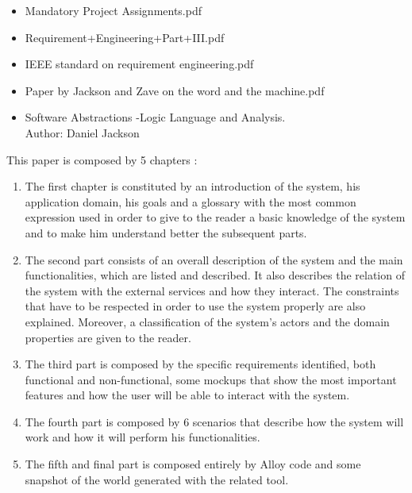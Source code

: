 \begin{itemize}
	\setlength{\leftskip}{0.5cm}
	\item Mandatory Project Assignments.pdf
	\item Requirement+Engineering+Part+III.pdf
	\item IEEE standard on requirement engineering.pdf
	\item Paper by Jackson and Zave on the word and the machine.pdf
	\item Software Abstractions -Logic Language and Analysis.\\
	Author: Daniel Jackson
\end{itemize}

This paper is composed by 5 chapters :
\begin{enumerate}
	\setlength{\leftskip}{0.5cm}
	\item The first chapter is constituted by an introduction of the system, his application domain, his goals and a glossary with the most common expression used in order to give to the reader a basic knowledge of the system and to make him understand better the subsequent parts.
	\item The second part consists of an overall description of the system and the main functionalities, which are listed and described. It also describes the relation of the system with the external services and how they interact. The constraints that have to be respected in order to use the system properly are also explained.
	Moreover, a classification of the system’s actors and the domain properties are given to the reader.
	\item The third part is composed by the specific requirements identified, both functional and non-functional, some mockups that show the most important features and how the user will be able to interact with the system.
	\item The fourth part is composed by 6 scenarios that describe how the system will work and how it will perform his functionalities.
	\item The fifth and final part is composed entirely by Alloy code and some snapshot of the world generated with the related tool.
\end{enumerate}